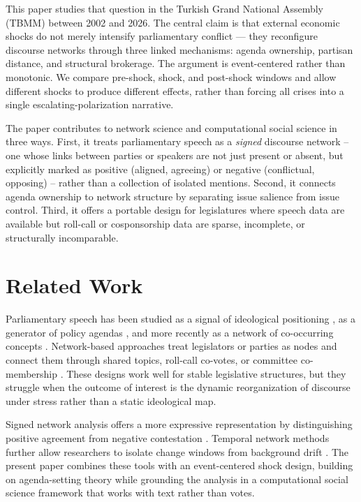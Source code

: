 \documentclass[conference]{IEEEtran}
\begin{document}
This paper studies that question in the Turkish Grand National Assembly (TBMM) between 2002 and 2026. The central claim is that external economic shocks do not merely intensify parliamentary conflict — they reconfigure discourse networks through three linked mechanisms: agenda ownership, partisan distance, and structural brokerage. The argument is event-centered rather than monotonic. We compare pre-shock, shock, and post-shock windows and allow different shocks to produce different effects, rather than forcing all crises into a single escalating-polarization narrative.

The paper contributes to network science and computational social science in three ways. First, it treats parliamentary speech as a \emph{signed} discourse network -- one whose links between parties or speakers are not just present or absent, but explicitly marked as positive (aligned, agreeing) or negative (conflictual, opposing) -- rather than a collection of isolated mentions. Second, it connects agenda ownership to network structure by separating issue salience from issue control. Third, it offers a portable design for legislatures where speech data are available but roll-call or cosponsorship data are sparse, incomplete, or structurally incomparable.

\smallskip
\section{Related Work}
Parliamentary speech has been studied as a signal of ideological positioning \cite{laver2003}, as a generator of policy agendas \cite{kleinnijenhuis1995}, and more recently as a network of co-occurring concepts \cite{garimella2018}. Network-based approaches treat legislators or parties as nodes and connect them through shared topics, roll-call co-votes, or committee co-membership \cite{porter2005}. These designs work well for stable legislative structures, but they struggle when the outcome of interest is the dynamic reorganization of discourse under stress rather than a static ideological map.

Signed network analysis offers a more expressive representation by distinguishing positive agreement from negative contestation \cite{bonchi2019, blohm2026}. Temporal network methods further allow researchers to isolate change windows from background drift \cite{gionis2024}. The present paper combines these tools with an event-centered shock design, building on agenda-setting theory \cite{kleinnijenhuis1995} while grounding the analysis in a computational social science framework that works with text rather than votes.
\end{document}
